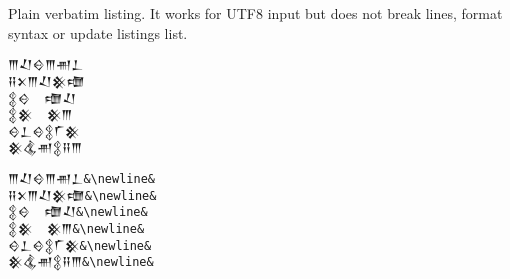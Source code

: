 \documentclass{article}
\begin{document}
\newpage

Plain verbatim listing. It works for UTF8 input but does not break
lines, format syntax or update listings list.

\Huge
\begin{verbatim}
𒐈𒑚𒄰𒐈𒉣𒁇
𒍝𒉽𒐈𒑚𒆜𒈩
𒉭𒄰  𒈩𒑚
𒉭𒆜  𒆜𒐈
𒄰𒁇𒄰𒉭𒇲𒆜
𒆜𒆬𒉣𒉭𒍝𒐈
\end{verbatim}
\normalsize

\newpage

\begin{minipage}{1.0\linewidth}

\Large

\centering

\begin{lstlisting}[language=hit,extendedchars=true,
basicstyle=\ttfamily\Huge\color{red},frame=shadowbox,
rulesepcolor=\color{blue},framexleftmargin=10mm]
𒐈𒑚𒄰𒐈𒉣𒁇&\newline&
𒍝𒉽𒐈𒑚𒆜𒈩&\newline&
𒉭𒄰  𒈩𒑚&\newline&
𒉭𒆜  𒆜𒐈&\newline&
𒄰𒁇𒄰𒉭𒇲𒆜&\newline&
𒆜𒆬𒉣𒉭𒍝𒐈&\newline&
\end{lstlisting}
\end{minipage}
\end{document}
